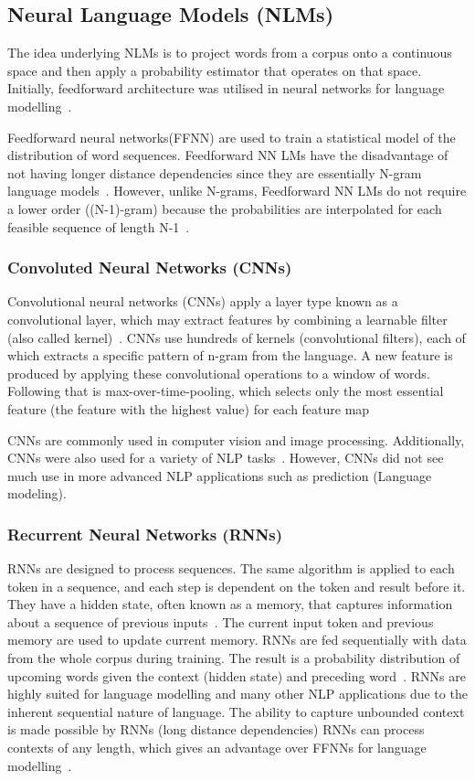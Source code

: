 \subsection{Neural Language Models (NLMs)}
The idea underlying NLMs is to project words from a corpus onto a continuous space and then apply a probability estimator that operates on that space. Initially, feedforward architecture was utilised in neural networks for language modelling~\cite{advancesnlm}.

Feedforward neural networks(FFNN) are used to train a statistical model of the distribution of word sequences. Feedforward NN LMs have the disadvantage of not having longer distance dependencies since they are essentially N-gram language models~\cite{advancesnlm}. However, unlike N-grams, Feedforward NN LMs do not require a lower order ((N-1)-gram) because the probabilities are interpolated for each feasible sequence of length N-1~\cite{largenlm}.

\subsubsection{Convoluted Neural Networks (CNNs)}
Convolutional neural networks (CNNs) apply a layer type known as a convolutional layer, which may extract features by combining a learnable filter (also called kernel)~\cite{cnn}. CNNs use hundreds of kernels (convolutional filters), each of which extracts a specific pattern of n-gram from the language. 
A new feature is produced by applying these convolutional operations to a window of words. Following that is max-over-time-pooling, which selects only the most essential feature (the feature with the highest value) for each feature map~\cite{sentencecnn, cnnclass}

CNNs are commonly used in computer vision and image processing.
Additionally, CNNs were also used for a variety of NLP tasks~\cite{object}. However, CNNs did not see much use in more advanced NLP applications such as prediction (Language modeling).

\subsubsection{Recurrent Neural Networks (RNNs)}
RNNs are designed to process sequences. The same algorithm is applied to each token in a sequence, and each step is dependent on the token and result before it. They have a hidden state, often known as a memory, that captures information about a sequence of previous inputs~\cite{Sherstinsky_2020}. The current input token and previous memory are used to update current memory. RNNs are fed sequentially with data from the whole corpus during training. The result is a probability distribution of upcoming words given the context (hidden state) and preceding word~\cite{Mikolov-lda}. RNNs are highly suited for language modelling and many other NLP applications due to the inherent sequential nature of language. The ability to capture unbounded context is made possible by RNNs (long distance dependencies) RNNs can process contexts of any length, which gives an advantage over FFNNs for language modelling~\cite{rnntrends}.

